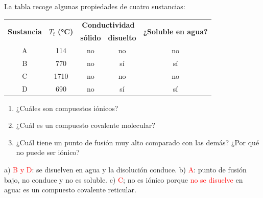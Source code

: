 \begin{exercise}
    La tabla recoge algunas propiedades de cuatro sustancias:
    \begin{center}
        \begin{tabular}{@{}ccccc@{}}
            \toprule
            \multirow{2}{*}{\textbf{Sustancia}} & \multirow{2}{*}{\textbf{\(T_\text{f}\) (\unit{\celsius})}} & \multicolumn{2}{c}{\textbf{Conductividad}} & \multirow{2}{*}{\textbf{¿Soluble en agua?}} \\[3pt]
             &  & \textbf{sólido} & \textbf{disuelto} &  \\[3pt]
            A & \num{114} & no & no & no \\[3pt]
            B & \num{770} & no & sí & sí \\[3pt]
            C & \num{1710} & no & no & no \\[3pt]
            D & \num{690} & no & sí & sí \\
            \bottomrule
        \end{tabular}
    \end{center}
    \begin{enumerate}[label=\alph*)]
        \item ¿Cuáles son compuestos iónicos?
        \item ¿Cuál es un compuesto covalente molecular?
        \item ¿Cuál tiene un punto de fusión muy alto comparado con las demás? ¿Por qué no puede ser iónico?
    \end{enumerate}
    \begin{solu}
        a) \textcolor{red}{B y D}: se disuelven en agua y la disolución conduce. b) \textcolor{red}{A}: punto de fusión bajo, no conduce y no es soluble. c) \textcolor{red}{C}; no es iónico porque \textcolor{red}{no se disuelve} en agua: es un compuesto covalente reticular.
    \end{solu}
\end{exercise}

